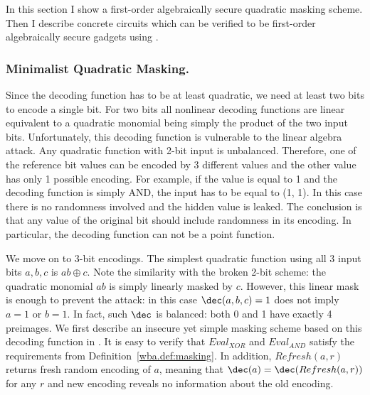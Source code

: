 
In this section I show a first-order algebraically secure quadratic masking scheme. Then I describe concrete circuits which can be verified to be first-order algebraically secure gadgets using .

\subsubsection{Minimalist Quadratic Masking.}
Since the decoding function has to be at least quadratic, we need at least two bits to encode a single bit. For two bits all nonlinear decoding functions are linear equivalent to a quadratic monomial being simply the product of the two input bits. Unfortunately, this decoding function is vulnerable to the linear algebra attack. Any quadratic function with 2-bit input is unbalanced. Therefore, one of the reference bit values can be encoded by 3 different values and the other value has only 1 possible encoding. For example, if the value is equal to 1 and the decoding function is simply AND, the input has to be equal to (1, 1). In this case there is no randomness involved and the hidden value is leaked. 
The conclusion is that any value of the original bit should include randomness in its encoding. In particular, the decoding function can not be a point function.

We move on to 3-bit encodings. The simplest quadratic function using all 3 input bits $a,b,c$ is $ab\oplus c$. Note the similarity with the broken 2-bit scheme: the quadratic monomial $ab$ is simply linearly masked by $c$. However, this linear mask is enough to prevent the attack: in this case $\dec(a,b,c)=1$ does not imply $a=1$ or $b=1$. In fact, such $\dec$ is balanced: both 0 and 1 have exactly 4 preimages. We first describe an insecure yet simple masking scheme based on this decoding function in . It is easy to verify that $Eval_{XOR}$ and $Eval_{AND}$ satisfy the requirements from Definition~\ref{wba.def:masking}. In addition, $Refresh(a, r)$ returns fresh random encoding of $a$, meaning that $\dec(a) = \dec(Refresh(a, r))$ for any $r$ and new encoding reveals no information about the old encoding.

